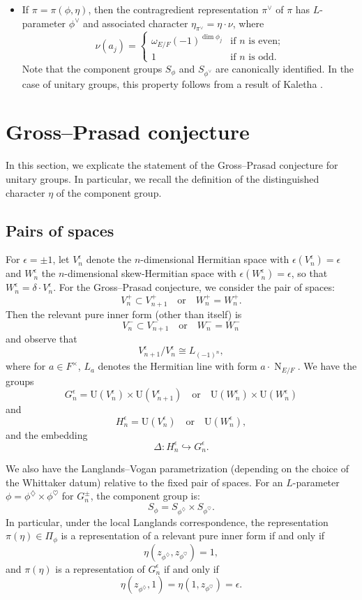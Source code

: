 \documentclass[11pt]{amsart}
\numberwithin{equation}{section}
\theoremstyle{plain}
\theoremstyle{definition}
\theoremstyle{remark}
\def\N{\operatorname{N}}
\def\U{\mathrm{U}}
\begin{document}
\begin{itemize}
\item 
If $\pi = \pi(\phi, \eta)$, then the contragredient representation $\pi^\vee$ of $\pi$ has $L$-parameter $\phi^{\vee}$ and associated character $\eta_{\pi^\vee} = \eta \cdot \nu$, where 
\[  
\nu(a_j)  = \begin{cases}
\omega_{E/F}(-1)^{\dim \phi_j} & \text{if $n$ is even;}  \\
1 & \text{if $n$ is odd.} \end{cases} \]
Note that the component groups $S_{\phi}$ and $S_{\phi^\vee}$ are canonically identified.
In the case of unitary groups, this property follows from a result of Kaletha \cite[\S 4]{ka}.

\end{itemize}

\section{\textbf{Gross--Prasad conjecture}}

In this section, we explicate the statement of the Gross--Prasad conjecture for unitary groups. In particular, we recall the definition of the distinguished character $\eta$ of the component group.

\subsection{Pairs of spaces}

For $\epsilon = \pm 1$, let $V_n^\epsilon$ denote the $n$-dimensional Hermitian space with $\epsilon(V_n^\epsilon) = \epsilon$ and $W_n^\epsilon$ the $n$-dimensional skew-Hermitian space with $\epsilon(W_n^\epsilon) = \epsilon$, so that $W_n^\epsilon = \delta \cdot V_n^\epsilon$.
For the Gross--Prasad conjecture, we consider the pair of spaces:
\[  V_n^+ \subset V_{n+1}^+ \quad \text{or} \quad W_n^+ = W_n^+. \]
Then the relevant pure inner form (other than itself) is 
\[  V_n^- \subset V_{n+1}^-  \quad \text{or} \quad W_n^- = W_n^- \]
and observe that
\[  V_{n+1}^{\epsilon}/V_n^{\epsilon}   \cong L_{(-1)^n}, \]
where for $a \in F^{\times}$, $L_a$ denotes the Hermitian line with form $a \cdot \N_{E/F}$.
We have the groups
\[  G_n^\epsilon =  \U(V_n^\epsilon) \times \U(V_{n+1}^\epsilon) \quad \text{or} \quad \U(W_n^\epsilon) \times \U(W_n^\epsilon) \]
and
\[   H_n^\epsilon = \U(V_n^\epsilon) \quad \text{or} \quad \U(W_n^\epsilon), \]
and the embedding
\[ \Delta : H_n^\epsilon \hookrightarrow G_n^\epsilon.\]

We also have the Langlands--Vogan parametrization (depending on the choice of the Whittaker datum) relative to the fixed pair of spaces.
For an $L$-parameter $\phi = \phi^{\diamondsuit} \times \phi^{\heartsuit}$ for $G_n^\pm$, the component group is:
\[  S_{\phi}  = S_{\phi^{\diamondsuit}}  \times S_{\phi^{\heartsuit}}. \]
In particular, under the local Langlands correspondence, the representation $\pi(\eta) \in \Pi_{\phi}$ is a representation of a relevant pure inner form if and only if
\[  \eta(z_{\phi^{\diamondsuit}}, z_{\phi^{\heartsuit}})  = 1, \]
and $\pi(\eta)$ is a representation of $G_n^{\epsilon}$ if and only if 
\[  \eta(z_{\phi^{\diamondsuit}}, 1)  = \eta(1,z_{\phi^{\heartsuit}})  = \epsilon. \]
\end{document}
